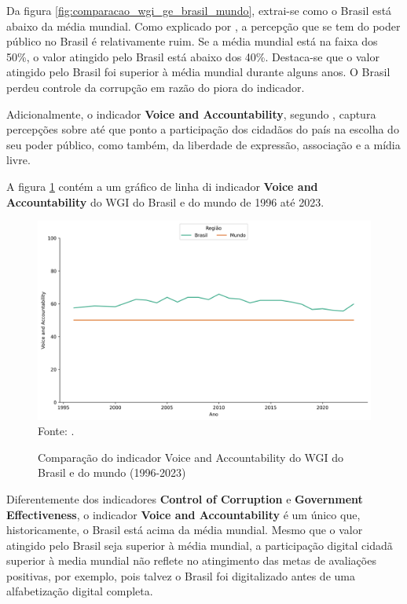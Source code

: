 Da figura \ref{fig:comparacao_wgi_ge_brasil_mundo}, extrai-se como o Brasil está abaixo da média mundial. Como explicado por \cite{kaufmann2024worldwide}, a percepção que se tem do poder público no Brasil é relativamente ruim. Se a média mundial está na faixa dos 50\%, o valor atingido pelo Brasil está abaixo dos 40\%. Destaca-se que o valor atingido pelo Brasil foi superior à média mundial durante alguns anos. O Brasil perdeu controle da corrupção em razão do piora do indicador.

Adicionalmente, o indicador \textbf{Voice and Accountability}, segundo  \cite{kaufmann2024worldwide}, captura percepções sobre até que ponto a participação dos cidadãos do país na escolha do seu poder público, como também, da liberdade de expressão, associação e a mídia livre.

A figura \ref{fig:comparacao_wgi_va_brasil_mundo} contém a um gráfico de linha di indicador \textbf{Voice and Accountability} do WGI do Brasil e do mundo de 1996 até 2023.

\begin{figure}[H]
	\centering
	\caption{Comparação do indicador Voice and Accountability do WGI do Brasil e do mundo (1996-2023)}
	\includegraphics[width=1\linewidth]{figuras/comparacao_wgi_va_brasil_mundo}
	\label{fig:comparacao_wgi_va_brasil_mundo}
	\footnotesize{Fonte: \cite{wgi_dados}.}
\end{figure}

Diferentemente dos indicadores  \textbf{Control of Corruption} e \textbf{Government Effectiveness}, o indicador \textbf{Voice and Accountability} é um único que, historicamente, o Brasil está acima da média mundial. Mesmo que o valor atingido pelo Brasil seja superior à média mundial, a participação digital cidadã superior à media mundial não reflete no atingimento das metas de avaliações positivas, por exemplo, pois talvez o Brasil foi digitalizado antes de uma alfabetização digital completa.

